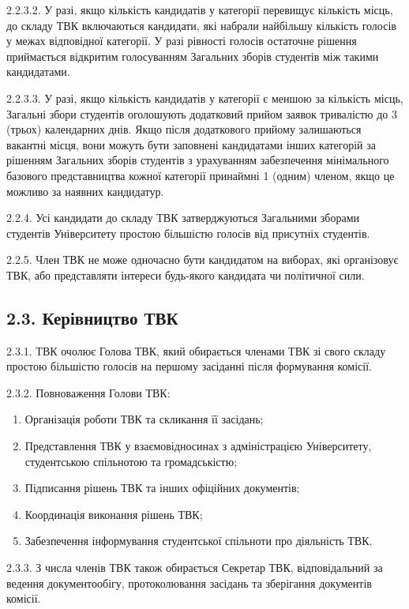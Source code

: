     2.2.3.2. У разі, якщо кількість кандидатів у категорії перевищує кількість місць, до складу ТВК включаються кандидати, які набрали найбільшу кількість голосів у межах відповідної категорії. У разі рівності голосів остаточне рішення приймається відкритим голосуванням Загальних зборів студентів між такими кандидатами.

    2.2.3.3. У разі, якщо кількість кандидатів у категорії є меншою за кількість місць, Загальні збори студентів оголошують додатковий прийом заявок тривалістю до 3 (трьох) календарних днів. Якщо після додаткового прийому залишаються вакантні місця, вони можуть бути заповнені кандидатами інших категорій за рішенням Загальних зборів студентів з урахуванням забезпечення мінімального базового представництва кожної категорії принаймні 1 (одним) членом, якщо це можливо за наявних кандидатур.

    2.2.4. Усі кандидати до складу ТВК затверджуються Загальними зборами студентів Університету простою більшістю голосів від присутніх студентів.

    2.2.5. Член ТВК не може одночасно бути кандидатом на виборах, які організовує ТВК, або представляти інтереси будь-якого кандидата чи політичної сили.

\subsection*{2.3. Керівництво ТВК}
    2.3.1. ТВК очолює Голова ТВК, який обирається членами ТВК зі свого складу простою більшістю голосів на першому засіданні після формування комісії.

    2.3.2. Повноваження Голови ТВК:

        \begin{enumerate}[label=\alph*)]
            \item Організація роботи ТВК та скликання її засідань;
            \item Представлення ТВК у взаємовідносинах з адміністрацією Університету, студентською спільнотою та громадськістю;
            \item Підписання рішень ТВК та інших офіційних документів;
            \item Координація виконання рішень ТВК;
            \item Забезпечення інформування студентської спільноти про діяльність ТВК.
        \end{enumerate}

    2.3.3. З числа членів ТВК також обирається Секретар ТВК, відповідальний за ведення документообігу, протоколювання засідань та зберігання документів комісії.

